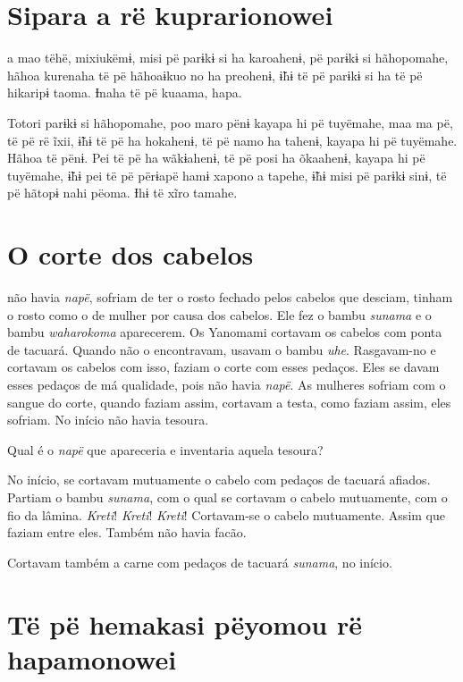 \chapter{Sipara a rë kuprarionowei}
 
 a mao tëhë, mixiukëmɨ, misi pë parɨkɨ si ha karoahenɨ, pë
parɨkɨ si hãhopomahe, hãhoa kurenaha të pë hãhoaɨkuo no ha preohenɨ,
ɨ̃hɨ të pë parɨkɨ si ha të pë hikaripɨ taoma. Ɨnaha të pë kuaama, hapa. 

Totori parɨkɨ si hãhopomahe, poo maro pënɨ kayapa hi pë tuyëmahe, maa ma
pë, të pë rë ĩxii, ɨ̃hɨ të pë ha hokahenɨ, të pë namo ha tahenɨ, kayapa
hi pë tuyëmahe. Hãhoa të pënɨ. Pei të pë ha wãkɨahenɨ, të pë posi ha
õkaahenɨ, kayapa hi pë tuyëmahe, ɨ̃hɨ pei të pë përɨapë hamɨ xapono a
tapehe, ɨ̃hɨ misi pë parɨkɨ sinɨ, të pë hãtopɨ nahi pëoma. Ɨhɨ të xĩro
tamahe. 

\chapter{O corte dos cabelos}
 
 não havia \textit{napë}, sofriam de ter o rosto fechado pelos
cabelos que desciam, tinham o rosto como o de mulher por causa dos
cabelos. Ele fez o bambu \textit{sunama} e o
bambu \textit{waharokoma} aparecerem. Os Yanomami cortavam os
cabelos com ponta de tacuará. Quando não o encontravam, usavam o
bambu \textit{uhe}. Rasgavam-no e cortavam os cabelos com isso, faziam o
corte com esses pedaços. Eles se davam esses pedaços de má qualidade,
pois não havia \textit{napë}. As mulheres sofriam com o sangue do corte,
quando faziam assim, cortavam a testa, como faziam assim, eles sofriam.
No início não havia tesoura. 

Qual é o \textit{napë} que apareceria e inventaria aquela tesoura?

No início, se cortavam mutuamente o cabelo com pedaços de tacuará
afiados. Partiam o bambu \textit{sunama}, com o qual se cortavam o cabelo
mutuamente, com o fio da lâmina. \textit{Kreti}! \textit{Kreti}! \textit{Kreti}! Cortavam-se o
cabelo mutuamente. Assim que faziam entre eles. Também não havia facão. 

Cortavam também a carne com pedaços de tacuará \textit{sunama}, no início.

\chapter{Të pë hemakasi pëyomou rë hapamonowei}
 
